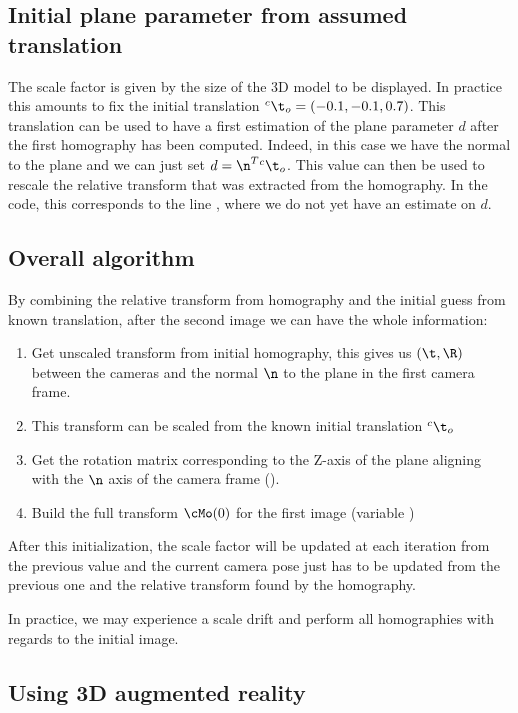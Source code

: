 \documentclass{ecnreport}
\begin{document}
\subsection{Initial plane parameter from assumed translation}
\label{sec:init}

The scale factor is given by the size of the 3D model to be displayed. In practice this amounts to fix the initial translation ${}^c\t_o = (-0.1,-0.1,0.7)$.
This translation can be used to have a first estimation of the plane parameter $d$ after the first homography has been computed.
Indeed, in this case we have the normal to the plane and we can just set $d = \n^T{}^c\t_o$. This value can then be used to rescale the relative transform 
that was extracted from the homography. 
In the code, this corresponds to the line , where we do not yet have an estimate on $d$.

\subsection{Overall algorithm}

By combining the relative transform from homography and the initial guess from known translation, after the second image we can have the whole information:
\begin{enumerate}
 \item Get unscaled transform from initial homography, this gives us $(\t,\R)$ between the cameras and the normal $\n$ to the plane in the first camera frame.
 \item This transform can be scaled from the known initial translation ${}^c\t_o$
 \item Get the rotation matrix corresponding to the Z-axis of the plane aligning with the $\n$ axis of the camera frame (). 
 \item Build the full transform $\cMo(0)$ for the first image (variable )
\end{enumerate}

After this initialization, the scale factor will be updated at each iteration from the previous value and the current camera pose just has to be updated from the previous one and the relative
transform found by the homography.

In practice, we may experience a scale drift and perform all homographies with regards to the initial image.

\subsection{Using 3D augmented reality}
\end{document}

